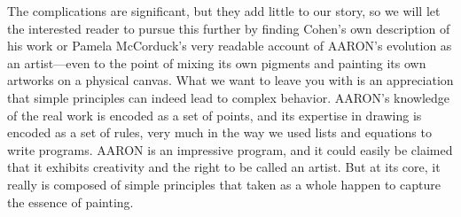 The complications are significant, but they add little to our story, so we will
let the interested reader to pursue this further by finding Cohen's own description
of his work or Pamela McCorduck's very readable account of AARON's evolution as an
artist---even to the point of mixing its own pigments and painting its own artworks 
on a physical canvas. What we want to leave you with is an appreciation that 
simple principles can indeed lead to complex behavior. AARON's knowledge of the
real work is encoded as a set of points, and its expertise in drawing is encoded
as a set of rules, very much in the way we used lists and equations to write programs.
AARON is an impressive program, and it could easily be claimed that it exhibits
creativity and the right to be called an artist. But at its core, it really is 
composed of simple principles that taken as a whole happen to capture the essence of 
painting.

